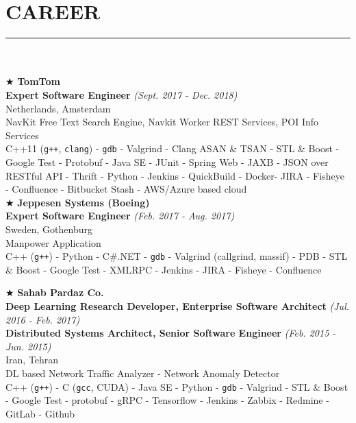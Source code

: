 \documentclass[10pt,a4paper]{article}
\begin{document}
\section{CAREER}
\noindent\rule {18.0cm}{0.2pt} \\ \\
$\bigstar$ \hspace{0.1cm} \large \textbf{TomTom} \\
\indent \small \textbf{Expert Software Engineer} \textsl{(Sept. 2017 - Dec. 2018)} \\
\indent \textnormal{Netherlands, Amsterdam} \\
\indent \textbullet \hspace{0.05cm} NavKit Free Text Search Engine, Navkit Worker REST Services, POI Info Services \\
\indent \textbullet \hspace{0.05cm} C++11 (\texttt{g++}, \texttt{clang}) - \texttt{gdb} - Valgrind - Clang ASAN \& TSAN - STL \& Boost - Google Test - Protobuf - Java SE - JUnit - Spring Web - JAXB - JSON over RESTful API - Thrift - Python - Jenkins - QuickBuild - Docker- JIRA - Fisheye - Confluence - Bitbucket Stash - AWS/Azure based cloud \\

\noindent $\bigstar$ \hspace{0.1cm} \large \textbf{Jeppesen Systems (Boeing)} \\
\indent \small \textbf{Expert Software Engineer} \textsl{(Feb. 2017 - Aug. 2017)} \\
\indent \textnormal{Sweden, Gothenburg} \\
\indent \textbullet \hspace{0.05cm} Manpower Application \\
\indent \textbullet \hspace{0.05cm} C++ (\texttt{g++}) - Python - C\#.NET - \texttt{gdb} - Valgrind (callgrind, massif) - PDB - STL \& Boost - Google Test - XMLRPC - Jenkins - JIRA - Fisheye - Confluence

\break

\noindent $\bigstar$ \hspace{0.1cm} \large \textbf{Sahab Pardaz Co.} \\
\indent \small \textbf{Deep Learning Research Developer, Enterprise Software Architect} \textsl{(Jul. 2016 - Feb. 2017)} \\
\indent \small \textbf{Distributed Systems Architect, Senior Software Engineer} \textsl{(Feb. 2015 - Jun. 2015)} \\
\indent \textnormal{Iran, Tehran} \\
\indent \textbullet \hspace{0.05cm} DL based Network Traffic Analyzer - Network Anomaly Detector \\
\indent \textbullet \hspace{0.05cm} C++ (\texttt{g++}) - C (\texttt{gcc}, CUDA) - Java SE - Python - \texttt{gdb} - Valgrind - STL \& Boost - Google Test - protobuf - gRPC - Tensorflow - Jenkins - Zabbix - Redmine - GitLab - Github \\
\end{document}
